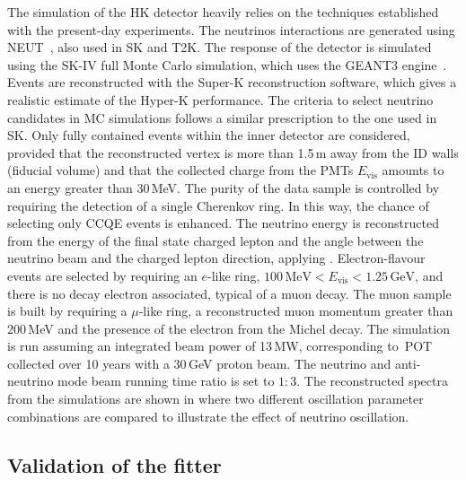 The simulation of the HK detector heavily relies on the techniques established with the present-day experiments.
The neutrinos interactions are generated using NEUT~\cite{Hayato:2002sd}, also used in SK and T2K.
The response of the detector is simulated using the SK-IV full Monte Carlo simulation, which uses the GEANT3 engine~\cite{Brun:1994aa}.
Events are reconstructed with the Super-K reconstruction software, which gives a realistic estimate of the Hyper-K performance.
The criteria to select neutrino candidates in MC simulations follows a similar prescription to the one used in SK.
Only fully contained events within the inner detector are considered, provided that the reconstructed vertex %
is more than 1.5\,m away from the ID walls (fiducial volume) and that the collected charge from the PMTs $E_\text{vis}$ %
amounts to an energy greater than 30\,MeV.
The purity of the data sample is controlled by requiring the detection of a single Cherenkov ring.
In this way, the chance of selecting only CCQE events is enhanced.
The neutrino energy is reconstructed from the energy of the final state charged lepton and %
the angle between the neutrino beam and the charged lepton direction, applying .
Electron-flavour events are selected by requiring an $e$-like ring, $100\,\text{MeV} < E_\text{vis} < 1.25\,\text{GeV}$, %
and there is no decay electron associated, typical of a muon decay.
The muon sample is built by requiring a $\mu$-like ring, a reconstructed muon momentum greater than $200$\,MeV %
and the presence of the electron from the Michel decay.
The simulation is run assuming an integrated beam power of 13\,MW, corresponding to \,POT %
collected over 10 years with a 30\,GeV proton beam.
The neutrino and anti-neutrino mode beam running time ratio is set to $1:3$.
The reconstructed spectra from the simulations are shown in  %
where two different oscillation parameter combinations are compared to illustrate the effect of neutrino oscillation.




\subsection{Validation of the fitter}
\label{sec:nuenorm}

